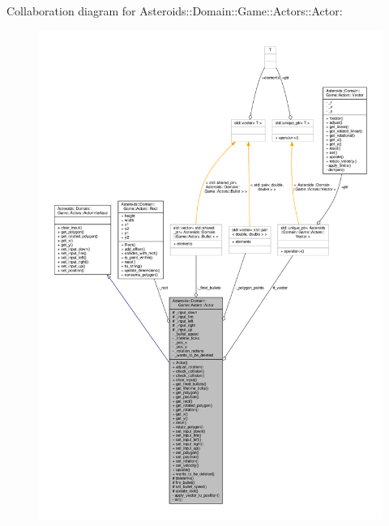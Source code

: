 Collaboration diagram for Asteroids\+:\+:Domain\+:\+:Game\+:\+:Actors\+:\+:Actor\+:\nopagebreak
\begin{figure}[H]
\begin{center}
\leavevmode
\includegraphics[width=350pt]{classAsteroids_1_1Domain_1_1Game_1_1Actors_1_1Actor__coll__graph}
\end{center}
\end{figure}

